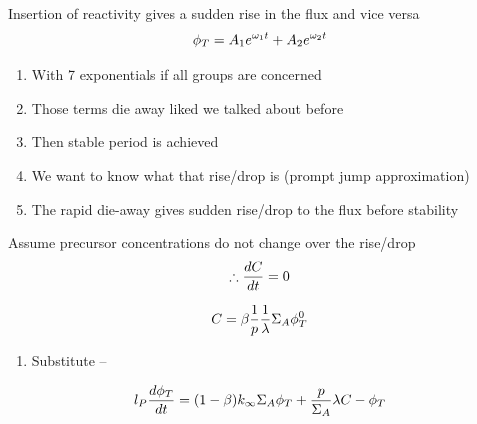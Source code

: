 \documentclass[aspectratio=1610,pdftex,dvipsnames,compress,xcolor={dvipsnames}]{beamer}
\begin{document}
\begin{frame}{Insertion of reactivity gives a sudden rise in the flux and vice versa}
    \begin{equation}
        \LARGE
        \phi_T = A_1 e^{\omega_1 t} + A_2 e^{\omega_2 t}
    \end{equation}

    \vspace*{\fill}

    \begin{enumerate}[series=outerlist,topsep=0pt,itemsep=21pt,leftmargin=*,label=(\arabic*)]
        \item[]With 7 exponentials if all groups are concerned 
        \item[]Those terms die away liked we talked about before
        \item[]Then stable period is achieved
        \item[]We want to know what that rise/drop is (prompt jump approximation)
        \item[]The rapid die-away gives sudden rise/drop to the flux before stability
    \end{enumerate}
\end{frame}


\begin{frame}{Assume precursor concentrations do not change over the rise/drop}
    \begin{equation}
        \LARGE
        \therefore \frac{dC}{dt} = 0
    \end{equation}

    \begin{equation}
        \LARGE
        C = \beta \frac{1}{p} \frac{1}{\lambda} \Sigma_A \phi_T^0
    \end{equation}

    \vspace*{\fill}

    \begin{enumerate}[series=outerlist,topsep=0pt,itemsep=21pt,leftmargin=*,label=(\arabic*)]
        \item[]Substitute --
    \end{enumerate}

    \vspace*{\fill}

    \begin{equation}
        \LARGE
        l_P \frac{d\phi_T}{dt} = (1-\beta) k_\infty \Sigma_A \phi_T + \frac{p}{\Sigma_A} \lambda C - \phi_T
    \end{equation}
\end{frame}
\end{document}
